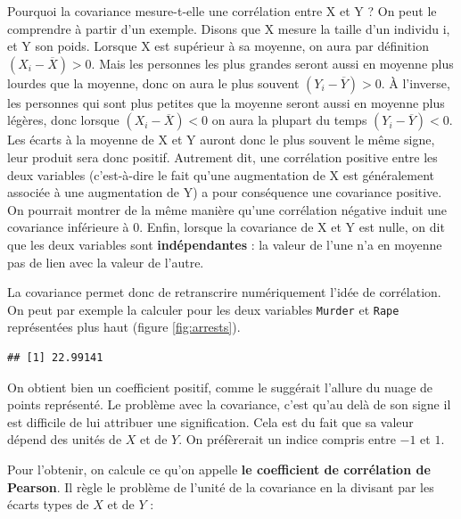 \documentclass[
  french,
]{book}
\newenvironment{Shaded}{\begin{snugshade}}{\end{snugshade}}
\newcommand{\FunctionTok}[1]{\textcolor[rgb]{0.00,0.00,0.00}{#1}}
\newcommand{\NormalTok}[1]{#1}
\newcommand{\SpecialCharTok}[1]{\textcolor[rgb]{0.00,0.00,0.00}{#1}}
\begin{document}
Pourquoi la covariance mesure-t-elle une corrélation entre X et Y ? On
peut le comprendre à partir d'un exemple. Disons que X mesure la taille
d'un individu i, et Y son poids. Lorsque X est supérieur à sa moyenne, on
aura par définition \((X_i - \overline{X}) > 0\). Mais les personnes les
plus grandes seront aussi en moyenne plus lourdes que la moyenne, donc
on aura le plus souvent \((Y_i - \overline{Y}) > 0\). À l'inverse, les
personnes qui sont plus petites que la moyenne seront aussi en moyenne
plus légères, donc lorsque \((X_i - \overline{X}) < 0\) on aura la plupart
du temps \((Y_i - \overline{Y}) < 0\). Les écarts à la moyenne de X et Y
auront donc le plus souvent le même signe, leur produit sera donc
positif. Autrement dit, une corrélation positive entre les deux
variables (c'est-à-dire le fait qu'une augmentation de X est
généralement associée à une augmentation de Y) a pour conséquence une
covariance positive. On pourrait montrer de la même manière qu'une
corrélation négative induit une covariance inférieure à 0. Enfin,
lorsque la covariance de X et Y est nulle, on dit que les deux variables
sont \textbf{indépendantes} : la valeur de l'une n'a en moyenne pas de lien
avec la valeur de l'autre.

La covariance permet donc de retranscrire numériquement l'idée de
corrélation. On peut par exemple la calculer pour les deux variables \texttt{Murder}
et \texttt{Rape} représentées plus haut (figure \ref{fig:arrests}).

\begin{Shaded}
\end{Shaded}

\begin{verbatim}
## [1] 22.99141
\end{verbatim}

On obtient bien un coefficient positif, comme le suggérait l'allure du nuage de
points représenté. Le problème avec la covariance, c'est qu'au delà de
son signe il est difficile de lui attribuer une signification. Cela est
du fait que sa valeur dépend des unités de \(X\) et de \(Y\). On préfèrerait
un indice compris entre \(-1\) et \(1\).

Pour l'obtenir, on calcule ce qu'on appelle \textbf{le coefficient de corrélation de Pearson}. Il règle le problème de l'unité de la covariance en la divisant par les écarts types de \(X\) et de \(Y\) :
\end{document}
